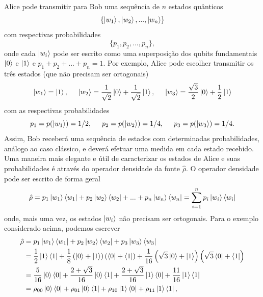 \documentclass{article}
\begin{document}
Alice pode transmitir para Bob uma sequência de $n$ estados quânticos
\begin{equation}
    \{ \ket{w_1},\ket{w_2},...,\ket{w_n} \}
\end{equation}
com respectivas probabilidades
\begin{equation}
    \{ p_1, p_2, ..., p_n \},
\end{equation}
onde cada $\ket{w_i}$ pode ser escrito como uma superposição dos qubits fundamentais $\ket{0}$ e $\ket{1}$ e $p_1 + p_2 + ... + p_n = 1$. Por exemplo, Alice pode escolher transmitir os três estados (que não precisam ser ortogonais)
\begin{equation}
    \ket{w_1} = \ket{1}, \hspace{0.5cm}
    \ket{w_2} = \frac{1}{\sqrt{2}}\ket{0} + \frac{1}{\sqrt{2}}\ket{1}, \hspace{0.5cm}
    \ket{w_3} = \frac{\sqrt{3}}{2}\ket{0} + \frac{1}{2}\ket{1}
\end{equation}
com as respectivas probabilidades
\begin{equation}
    p_1 = p(\ket{w_1}) = 1/2, \hspace{0.5cm} p_2 = p(\ket{w_2}) = 1/4, \hspace{0.5cm} p_3 = p(\ket{w_3}) = 1/4.
\end{equation}
Assim, Bob receberá uma sequência de estados com determinadas probabilidades, análogo ao caso clássico, e deverá efetuar uma medida em cada estado recebido. Uma maneira mais elegante e útil de caracterizar os estados de Alice e  suas probabilidades é através do operador densidade da fonte $\hat{\rho}$. O operador densidade pode ser escrito de forma geral
\begin{equation}
    \hat{\rho} = p_1\ket{w_1}\bra{w_1} + p_2\ket{w_2}\bra{w_2} + ... + p_n\ket{w_n}\bra{w_n} = \sum_{i=1}^n p_i \ket{w_i}\bra{w_i}
\end{equation}
onde, mais uma vez, os estados $\ket{w_i}$ não precisam ser ortogonais. Para o exemplo considerado acima, podemos escrever
\begin{equation}
\begin{split}
    \hat{\rho} &= p_1\ket{w_1}\bra{w_1} + p_2\ket{w_2}\bra{w_2} + p_3\ket{w_3}\bra{w_3} \\
               &= \frac{1}{2}\ket{1}\bra{1} + \frac{1}{8}\left( \ket{0} + \ket{1} \right)\left( \bra{0} + \bra{1} \right) + \frac{1}{16}\left( \sqrt{3}\ket{0} + \ket{1} \right)\left( \sqrt{3}\bra{0} + \bra{1} \right) \\
               &= \frac{5}{16}\ket{0}\bra{0} + \frac{2+\sqrt{3}}{16}\ket{0}\bra{1}+ \frac{2+\sqrt{3}}{16}\ket{1}\bra{0} + \frac{11}{16}\ket{1}\bra{1} \\
               &= \rho_{00}\ket{0}\bra{0} + \rho_{01}\ket{0}\bra{1}+ \rho_{10}\ket{1}\bra{0} + \rho_{11}\ket{1}\bra{1},
\end{split}
\end{equation}
\end{document}
